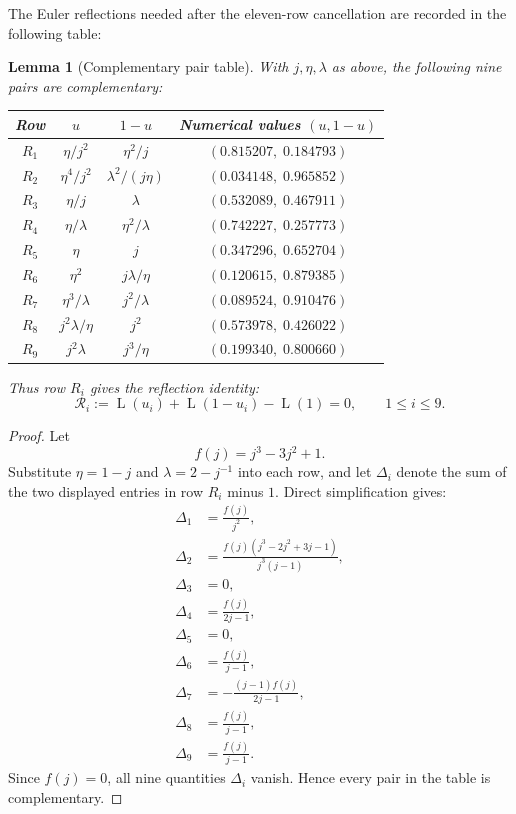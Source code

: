 \documentclass[preprint,12pt,number]{elsarticle}
\newtheorem{lemma}[theorem]{Lemma}
\theoremstyle{remark}
\newcommand{\Lr}{\operatorname{L}}
\begin{document}
The Euler reflections needed after the eleven-row cancellation are recorded
in the following table:

\begin{lemma}[Complementary pair table]\label{lem:m19pairs}
With $j,\eta,\lambda$ as above, the following nine pairs are complementary:

\begin{center}
\begin{tabular}{@{}cccc@{}}
\toprule
Row & $u$ & $1-u$ & Numerical values $(u,1-u)$\\
\midrule
$R_1$ & $\eta/j^2$          & $\eta^2/j$
      & $(0.815207,\;0.184793)$\\
$R_2$ & $\eta^4/j^2$        & $\lambda^2/(j\eta)$
      & $(0.034148,\;0.965852)$\\
$R_3$ & $\eta/j$            & $\lambda$
      & $(0.532089,\;0.467911)$\\
$R_4$ & $\eta/\lambda$      & $\eta^2/\lambda$
      & $(0.742227,\;0.257773)$\\
$R_5$ & $\eta$              & $j$
      & $(0.347296,\;0.652704)$\\
$R_6$ & $\eta^2$            & $j\lambda/\eta$
      & $(0.120615,\;0.879385)$\\
$R_7$ & $\eta^3/\lambda$    & $j^2/\lambda$
      & $(0.089524,\;0.910476)$\\
$R_8$ & $j^2\lambda/\eta$   & $j^2$
      & $(0.573978,\;0.426022)$\\
$R_9$ & $j^2\lambda$        & $j^3/\eta$
      & $(0.199340,\;0.800660)$\\
\bottomrule
\end{tabular}
\end{center}

Thus row $R_i$ gives the reflection identity:
\begin{equation}\label{eq:Ri}
\mathcal R_i:=\Lr(u_i)+\Lr(1-u_i)-\Lr(1)=0,
\qquad 1\le i\le 9.
\end{equation}
\end{lemma}

\begin{proof}
Let
\[
f(j)=j^3-3j^2+1.
\]
Substitute $\eta=1-j$ and $\lambda=2-j^{-1}$ into each row, and let
$\Delta_i$ denote the sum of the two displayed entries in row $R_i$ minus
$1$.  Direct simplification gives:
\[
\begin{aligned}
\Delta_1&=\frac{f(j)}{j^2},\\
\Delta_2&=\frac{f(j)(j^3-2j^2+3j-1)}{j^3(j-1)},\\
\Delta_3&=0,\\
\Delta_4&=\frac{f(j)}{2j-1},\\
\Delta_5&=0,\\
\Delta_6&=\frac{f(j)}{j-1},\\
\Delta_7&=-\frac{(j-1)f(j)}{2j-1},\\
\Delta_8&=\frac{f(j)}{j-1},\\
\Delta_9&=\frac{f(j)}{j-1}.
\end{aligned}
\]
Since $f(j)=0$, all nine quantities $\Delta_i$ vanish.  Hence every pair
in the table is complementary.
\end{proof}
\end{document}
